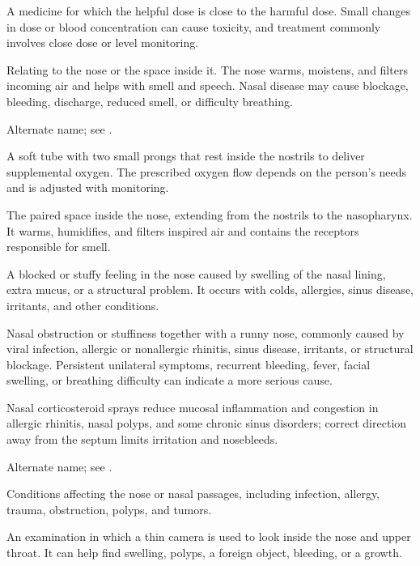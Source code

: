  A medicine for which the helpful dose is close to the harmful dose. Small changes in dose or blood concentration can cause toxicity, and treatment commonly involves close dose or level monitoring.

 Relating to the nose or the space inside it. The nose warms, moistens, and filters incoming air and helps with smell and speech. Nasal disease may cause blockage, bleeding, discharge, reduced smell, or difficulty breathing.

 Alternate name; see .

 A soft tube with two small prongs that rest inside the nostrils to deliver supplemental oxygen. The prescribed oxygen flow depends on the person's needs and is adjusted with monitoring.

 The paired space inside the nose, extending from the nostrils to the nasopharynx. It warms, humidifies, and filters inspired
air and contains the receptors responsible for smell.

 A blocked or stuffy feeling in the nose caused by swelling of the nasal lining, extra mucus, or a structural problem. It occurs with colds, allergies, sinus disease, irritants, and other conditions.

 Nasal obstruction or stuffiness together with a runny nose, commonly caused by viral infection, allergic or nonallergic rhinitis, sinus disease, irritants, or structural blockage. Persistent unilateral symptoms, recurrent bleeding, fever, facial swelling, or breathing difficulty can indicate a more serious cause.

 Nasal corticosteroid sprays reduce mucosal inflammation and congestion in allergic rhinitis, nasal polyps, and some chronic sinus disorders; correct direction away from the septum limits irritation and nosebleeds.

 Alternate name; see .

 Conditions affecting the nose or nasal passages, including infection, allergy, trauma, obstruction, polyps, and tumors.

 An examination in which a thin camera is used to look inside the nose and upper throat. It can help find swelling, polyps, a foreign object, bleeding, or a growth.

